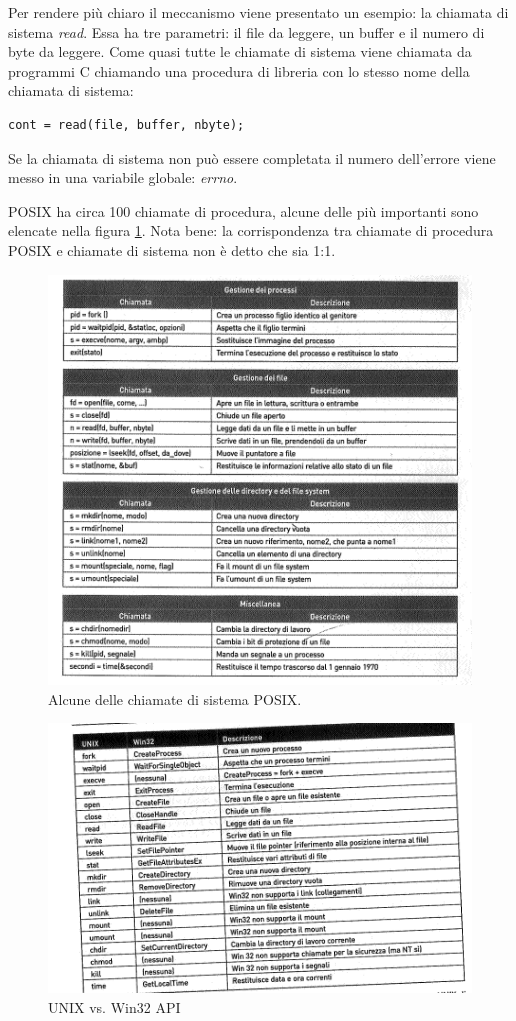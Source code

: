 Per rendere più chiaro il meccanismo viene presentato un esempio: la chiamata di sistema \textit{read}. Essa ha tre parametri: il file da leggere, un buffer e il numero di byte da leggere. Come quasi tutte le chiamate di sistema viene chiamata da programmi C chiamando una procedura di libreria con lo stesso nome della chiamata di sistema: 
\begin{lstlisting}
cont = read(file, buffer, nbyte);
\end{lstlisting}

Se la chiamata di sistema non può essere completata il numero dell'errore viene messo in una variabile globale: \textit{errno}.

POSIX ha circa 100 chiamate di procedura, alcune delle più importanti sono elencate nella figura \ref{chiamate2}.
Nota bene: la corrispondenza tra chiamate di procedura POSIX e chiamate di sistema non è detto che sia 1:1.

\begin{figure}[!ht]
  \centering
  \includegraphics[width=0.7\linewidth]{assets/chiamate2.png}
  \caption{Alcune delle chiamate di sistema POSIX.}
  \label{chiamate2}
\end{figure}

\begin{figure}[!ht]
  \centering
  \includegraphics[width=0.7\linewidth]{assets/windows2.png}
  \caption{UNIX vs. Win32 API}
\end{figure}



